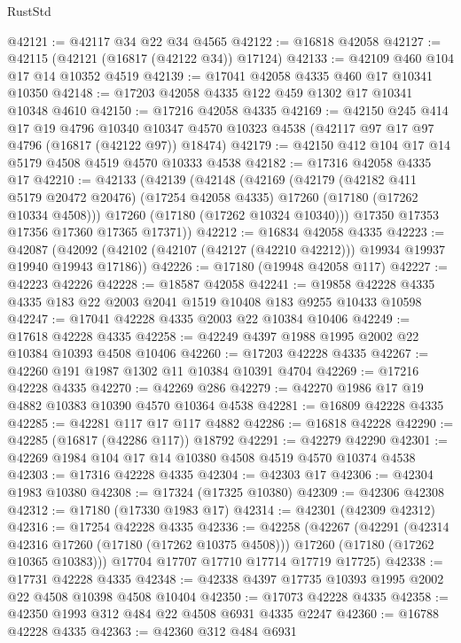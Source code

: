 \begin{lexlean}{RustStd}
\begin{coremodule}
{\begin{coremodule}
{{{{{{{{{{{{{{{{{{{{{{{{{{{{{{{{{{{{{{{{{{{{{{{{{{{{{{{@42121 := @42117 @34 @22 @34 @4565
@42122 := @16818 @42058
@42127 := @42115 (@42121 (@16817 (@42122 @34)) @17124)
@42133 := @42109 @460 @104 @17 @14 @10352 @4519
@42139 := @17041 @42058 @4335 @460 @17 @10341 @10350
@42148 := @17203 @42058 @4335 @122 @459 @1302 @17 @10341 @10348 @4610
@42150 := @17216 @42058 @4335
@42169 := @42150
    @245
    @414
    @17
    @19
    @4796
    @10340
    @10347
    @4570
    @10323
    @4538
    (@42117 @97 @17 @97 @4796 (@16817 (@42122 @97)) @18474)
@42179 := @42150 @412 @104 @17 @14 @5179 @4508 @4519 @4570 @10333 @4538
@42182 := @17316 @42058 @4335 @17
@42210 := @42133
    (@42139
      (@42148
        (@42169
          (@42179
            (@42182 @411 @5179 @20472 @20476)
            (@17254 @42058 @4335)
            @17260
            (@17180 (@17262 @10334 @4508)))
          @17260
          (@17180 (@17262 @10324 @10340)))
        @17350
        @17353
        @17356
        @17360
        @17365
        @17371))
@42212 := @16834 @42058 @4335
@42223 := @42087
    (@42092 (@42102 (@42107 (@42127 (@42210 @42212))) @19934 @19937 @19940 @19943 @17186))
@42226 := @17180 (@19948 @42058 @117)
@42227 := @42223 @42226
@42228 := @18587 @42058
@42241 := @19858 @42228 @4335 @4335 @183 @22 @2003 @2041 @1519 @10408 @183 @9255 @10433 @10598
@42247 := @17041 @42228 @4335 @2003 @22 @10384 @10406
@42249 := @17618 @42228 @4335
@42258 := @42249 @4397 @1988 @1995 @2002 @22 @10384 @10393 @4508 @10406
@42260 := @17203 @42228 @4335
@42267 := @42260 @191 @1987 @1302 @11 @10384 @10391 @4704
@42269 := @17216 @42228 @4335
@42270 := @42269 @286
@42279 := @42270 @1986 @17 @19 @4882 @10383 @10390 @4570 @10364 @4538
@42281 := @16809 @42228 @4335
@42285 := @42281 @117 @17 @117 @4882
@42286 := @16818 @42228
@42290 := @42285 (@16817 (@42286 @117)) @18792
@42291 := @42279 @42290
@42301 := @42269 @1984 @104 @17 @14 @10380 @4508 @4519 @4570 @10374 @4538
@42303 := @17316 @42228 @4335
@42304 := @42303 @17
@42306 := @42304 @1983 @10380
@42308 := @17324 (@17325 @10380)
@42309 := @42306 @42308
@42312 := @17180 (@17330 @1983 @17)
@42314 := @42301 (@42309 @42312)
@42316 := @17254 @42228 @4335
@42336 := @42258
    (@42267
      (@42291
        (@42314 @42316 @17260 (@17180 (@17262 @10375 @4508)))
        @17260
        (@17180 (@17262 @10365 @10383)))
      @17704
      @17707
      @17710
      @17714
      @17719
      @17725)
@42338 := @17731 @42228 @4335
@42348 := @42338 @4397 @17735 @10393 @1995 @2002 @22 @4508 @10398 @4508 @10404
@42350 := @17073 @42228 @4335
@42358 := @42350 @1993 @312 @484 @22 @4508 @6931 @4335 @2247
@42360 := @16788 @42228 @4335
@42363 := @42360 @312 @484 @6931
}}}}}}}}}}}}}}}}}}}}}}}}}}}}}}}}}}}}}}}}}}}}}}}}}}}}}}}
\end{coremodule}}
\end{coremodule}
\end{lexlean}
